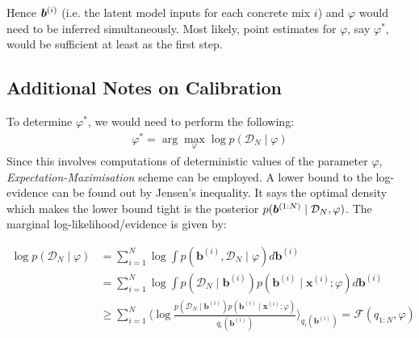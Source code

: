 Hence $\boldsymbol{b}^{(i)}$ (i.e. the latent model inputs for each concrete mix $i$) and  $\varphi$ would need to be inferred simultaneously. 
Most likely, point estimates for $\varphi$, say $\varphi^*$, would be sufficient at least as the first step.

\subsection*{Additional Notes on Calibration}
To determine $\varphi^*$, we would need to perform the following:
\begin{align}
	\varphi^{*} = \arg \max_{\varphi} \log p(\mathcal{D}_N \mid \varphi)
\end{align}
Since this involves computations of deterministic values of the parameter $\varphi$, \textit{Expectation-Maximisation} scheme can be employed. A lower bound to the log-evidence can be found out by Jensen's inequality. It says the optimal density which makes the lower bound tight is the posterior $p(\boldsymbol{b}^{(1:N)} \mid \mathcal{D}_N, \varphi)$. The marginal log-likelihood/evidence is given by:

\begin{align}
	\log p(\mathcal{D}_N \mid \varphi) &= \sum_{i=1}^N\log \int p(\bm {b}^{(i)},\mathcal{D}_N\mid \varphi)d\bm {b}^{(i)}\\
	&= \sum_{i=1}^N \log \int p(\mathcal{D}_N \mid \bm {b}^{(i)}) p(\bm b^{(i)}\mid\bm x^{(i)};\varphi) d\bm b^{(i)}\\
	&\geq \sum_{i=1}^N \langle \log \frac{ p(\mathcal{D}_N \mid \bm b^{(i)}) p(\bm b^{(i)}\mid\bm x^{(i)};\varphi)}{q_i(\bm b^{(i)})} \rangle_{q_i(\bm b^{(i)})}=\mathcal{F}(q_{1:N},\varphi)
\end{align}

